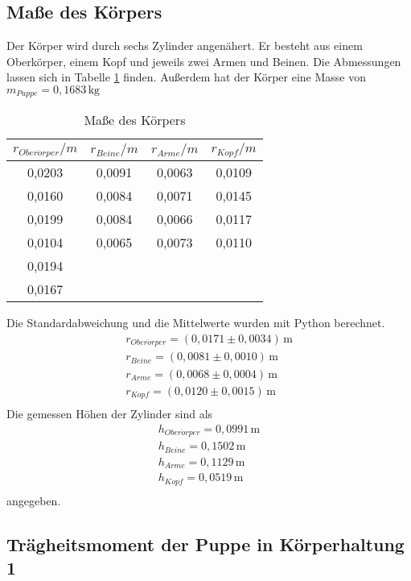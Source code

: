 \subsection{Maße des Körpers}
\label{sec:maskoerper}
Der Körper wird durch sechs Zylinder angenähert. Er besteht aus einem Oberkörper, einem Kopf und jeweils zwei Armen und Beinen.
Die Abmessungen lassen sich in Tabelle \ref{tab:r_Koerper} finden. Außerdem hat der Körper eine Masse von $m_{Puppe} = 0{,}1683\,\mathrm{kg}$
\begin{table}
  \centering
  \caption{Maße des Körpers}
  \label{tab:r_Koerper}
  \begin{tabular}{c c c c}
    \toprule
    $r_{Ober\ddot{o}rper}/m$ & $r_{Beine}/m$ & $r_{Arme}/m$ & $r_{Kopf}/m$ \\
    \midrule
    0,0203 &  0,0091 &  0,0063 & 0,0109 \\
    0,0160 &  0,0084 &  0,0071 & 0,0145 \\
    0,0199 &  0,0084 &  0,0066 & 0,0117 \\
    0,0104 &  0,0065 &  0,0073 & 0,0110 \\
    0,0194 &         &         &        \\
    0,0167 &         &         &        \\
    \bottomrule
  \end{tabular}
\end{table}
Die Standardabweichung und die Mittelwerte wurden mit Python berechnet.
\begin{align*}
  r_{Ober\ddot{o}rper}       = (0{,}0171 \pm 0{,}0034)\, \mathrm{m} \\
  r_{Beine}      = (0{,}0081 \pm 0{,}0010)\, \mathrm{m} \\
  r_{Arme}       = (0{,}0068 \pm 0{,}0004)\, \mathrm{m} \\
  r_{Kopf}       = (0{,}0120 \pm 0{,}0015)\, \mathrm{m} \\
\end{align*}
Die gemessen Höhen der Zylinder sind als
\begin{align*}
  h_{Ober\ddot{o}rper}       = 0{,}0991 \, \mathrm{m} \\
  h_{Beine}      = 0{,}1502 \, \mathrm{m} \\
  h_{Arme}       = 0{,}1129 \, \mathrm{m} \\
  h_{Kopf}       = 0{,}0519 \, \mathrm{m} \\
\end{align*}
angegeben.

\subsection{Trägheitsmoment der Puppe in Körperhaltung 1}
\label{sec:TraegheitsmomentderPuppeinKoerperhaltung 1}
